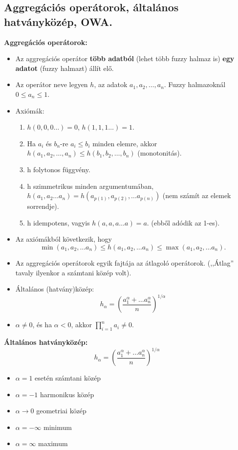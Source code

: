 \subsection{Aggregációs operátorok, általános hatványközép, OWA.}

\textbf{Aggregációs operátorok:}
\begin{itemize}
    \item Az aggregációs operátor \textbf{több adatból} (lehet több fuzzy halmaz is) \textbf{egy adatot} (fuzzy halmazt) állít elő.
    \item Az operátor neve legyen $h$, az adatok $a_1, a_2, \dots , a_n$. Fuzzy halmazoknál $0 \le a_n \le 1$.
    \item Axiómák:
    \begin{enumerate}
        \item $h(0,0,0\dots) = 0$, $h(1,1,1\dots) = 1$.
        \item Ha $a_i$ és $b_n$-re $a_i \le b_i$ minden elemre, akkor $h(a_1, a_2, \dots , a_n) \le h(b_1, b_2, \dots , b_n)$ (monotonitás).
        \item h folytonos függvény.
        \item h szimmetrikus minden argumentumában, $h(a_1, a_2 \dots a_n) = h(a_{p(1)}, a_{p(2)}, \dots a_{p(n)})$ (nem számít az elemek sorrendje).
        \item h idempotens, vagyis $h(a, a, a \dots a) = a$. (ebből adódik az 1-es).
    \end{enumerate}
    \item Az axiómákból következik, hogy
    \begin{equation*}
        \min(a_1, a_2, \dots a_n) \le h(a_1, a_2, \dots a_n) \le \max(a_1, a_2, \dots a_n).
    \end{equation*}
    \item Az aggregációs operátorok egyik fajtája az átlagoló operátorok. (,,Átlag'' tavaly ilyenkor a számtani közép volt).
    \item Általános (hatvány)közép:
    \begin{equation*}
        h_\alpha = \left( \frac{a_1^\alpha + \dots a_n^\alpha}{n} \right)^{1/\alpha}
    \end{equation*}
    \item $\alpha \neq 0$, és ha $\alpha < 0$, akkor $\prod_{i=1}^n a_i \neq 0$.
\end{itemize}

\textbf{Általános hatványközép:}
\begin{equation*}
    h_\alpha = \left( \frac{a_1^\alpha + \dots a_n^\alpha}{n} \right)^{1/\alpha}
\end{equation*}
\begin{itemize}
    \item $\alpha=1$ esetén számtani közép
    \item $\alpha=-1$ harmonikus közép
    \item $\alpha \to 0$ geometriai közép
    \item $\alpha=-\infty$ minimum
    \item $\alpha=\infty$ maximum
\end{itemize}

